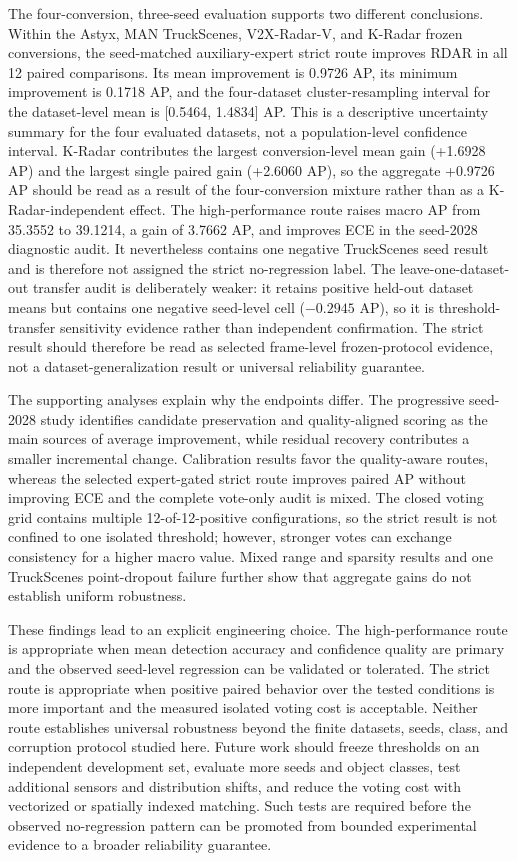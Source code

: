 \documentclass[preprint,12pt,times]{elsarticle}
\begin{document}
The four-conversion, three-seed evaluation supports two different conclusions.
Within the Astyx, MAN TruckScenes, V2X-Radar-V, and K-Radar frozen conversions,
the seed-matched auxiliary-expert strict route
improves RDAR in all 12 paired comparisons. Its mean improvement is 0.9726 AP,
its minimum improvement is 0.1718 AP, and the four-dataset cluster-resampling
interval for the dataset-level mean is [0.5464, 1.4834] AP. This is a
descriptive uncertainty summary for the four evaluated datasets, not a
population-level confidence interval. K-Radar contributes the largest
conversion-level mean gain (+1.6928 AP) and the largest single paired gain
(+2.6060 AP), so the aggregate +0.9726 AP should be read as a result of the
four-conversion mixture rather than as a K-Radar-independent effect. The
high-performance route raises macro AP
from 35.3552 to 39.1214, a gain of 3.7662 AP, and improves ECE in the
seed-2028 diagnostic audit. It nevertheless contains one negative
TruckScenes seed result and is therefore not assigned the strict
no-regression label. The leave-one-dataset-out transfer audit is deliberately
weaker: it retains positive held-out dataset means but contains one negative
seed-level cell ($-0.2945$ AP), so it is threshold-transfer sensitivity evidence
rather than independent confirmation. The strict result should therefore be
read as selected frame-level frozen-protocol evidence, not a
dataset-generalization result or universal reliability guarantee.

The supporting analyses explain why the endpoints differ. The progressive
seed-2028 study identifies candidate preservation and quality-aligned scoring
as the main sources of average improvement, while residual recovery contributes
a smaller incremental change. Calibration results favor the quality-aware
routes, whereas the selected expert-gated strict route improves paired AP
without improving ECE and the complete vote-only audit is mixed. The
closed voting grid contains multiple 12-of-12-positive configurations, so the
strict result is not confined to one isolated threshold; however, stronger
votes can exchange consistency for a higher macro value. Mixed range and
sparsity results and one TruckScenes point-dropout failure further show that
aggregate gains do not establish uniform robustness.

These findings lead to an explicit engineering choice. The high-performance
route is appropriate when mean detection accuracy and confidence quality are
primary and the observed seed-level regression can be validated or tolerated.
The strict route is appropriate when positive paired behavior over the tested
conditions is more important and the measured isolated voting cost is
acceptable. Neither route establishes universal robustness beyond the finite
datasets, seeds, class, and corruption protocol studied here. Future work
should freeze thresholds on an independent development set, evaluate more
seeds and object classes, test additional sensors and distribution shifts, and
reduce the voting cost with vectorized or spatially indexed matching. Such
tests are required before the observed no-regression pattern can be promoted
from bounded experimental evidence to a broader reliability guarantee.
\end{document}
